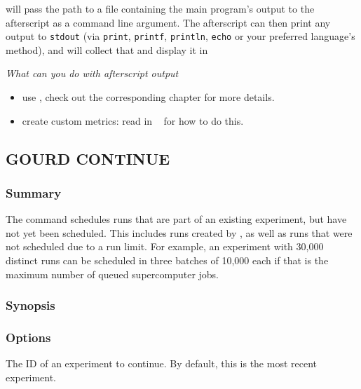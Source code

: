 \documentclass[a4paper,english]{article}
\begin{document}
\begin{adjustwidth}{18pt}{0pt}
                 will pass the path to a file containing the main program's output to the afterscript as a command line argument.
                The afterscript can then print any output to \texttt{stdout} 
                (via \texttt{print}, \texttt{printf}, \texttt{println}, \texttt{echo} or your preferred language's method),
                and  will collect that and display it in 
                ~~~
                
                \emph{What can you do with afterscript output}

                \begin{itemize}
                    \item use , check out the corresponding chapter for more details.
                    \item create custom metrics: read in ~ for how to do this.
                \end{itemize}
        \subsection{GOURD CONTINUE}

            \subsubsection{Summary}
                The   command schedules runs that are part of an existing
                experiment, but have not yet been scheduled. This includes runs created by  , as well as runs that were not scheduled due to a run limit.
                For example, an experiment with 30,000 distinct runs can be scheduled in three batches
                of 10,000 each if that is the maximum number of queued supercomputer jobs. 

            \subsubsection{Synopsis}
                 

            \subsubsection{Options}
                \begin{Description}[Options]
                  \item[\Arg{experiment-id}]
                    The ID of an experiment to continue.
                    By default, this is the most recent experiment.
                \end{Description}


\end{adjustwidth}
\end{document}
